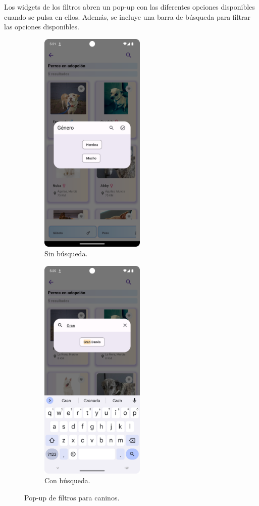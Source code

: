 \documentclass[a4paper, 12pt]{article}
\begin{document}
Los widgets de los filtros abren un pop-up con las diferentes opciones disponibles cuando se pulsa en ellos. Además, se incluye una barra de búsqueda para filtrar las opciones disponibles.


\begin{figure}[H]
   	\begin{subfigure}{0.48\textwidth}
		\begin{center}
			{\includegraphics[width=5cm]{app/FiltersDialog.png}\par}
			\caption{Sin búsqueda.}
		\end{center}  
	\end{subfigure}\hfill
   	\begin{subfigure}{0.48\textwidth}
		\begin{center}
			{\includegraphics[width=5cm]{app/FilterSearch.png}\par}
			\caption{Con búsqueda.}
		\end{center}  
	\end{subfigure}\hfill
	\caption{Pop-up de filtros para caninos.}
\end{figure}
\end{document}
